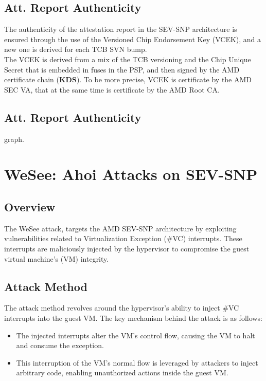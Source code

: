 \subsection{Att. Report Authenticity}

The authenticity of the attestation report in the SEV-SNP architecture is ensured through the use of the Versioned Chip Endorsement Key (VCEK), and a new one is derived for each TCB SVN bump. \\

The VCEK is derived from a mix of the TCB versioning and the Chip Unique Secret that is embedded in fuses in the PSP, and then signed by the AMD certificate chain (\textbf{KDS}). 
To be more precise, VCEK is certificate by the AMD SEC VA, that at the same time is certificate by the AMD Root CA.

\subsection{Att. Report Authenticity}

graph.

\section{WeSee: Ahoi Attacks on SEV-SNP}

\subsection{Overview}
The WeSee attack, targets the AMD SEV-SNP architecture by exploiting vulnerabilities related to Virtualization Exception (\#VC) interrupts. These interrupts are maliciously injected by the hypervisor to compromise the guest virtual machine's (VM) integrity.

\subsection{Attack Method}
The attack method revolves around the hypervisor's ability to inject \#VC interrupts into the guest VM. The key mechanism behind the attack is as follows:
\begin{itemize}
    \item The injected interrupts alter the VM's control flow, causing the VM to halt and consume the exception.
    \item This interruption of the VM's normal flow is leveraged by attackers to inject arbitrary code, enabling unauthorized actions inside the guest VM.
\end{itemize}


